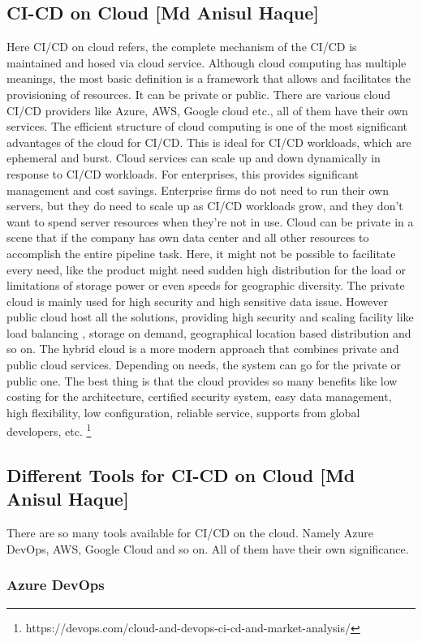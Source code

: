 %
\subsection{CI-CD on Cloud [Md Anisul Haque]}
%
Here CI/CD on cloud refers, the complete mechanism of the CI/CD is maintained and hosed via cloud service. Although cloud computing has multiple meanings, the most basic definition is a framework that allows and facilitates the provisioning of resources. It can be private or public. There are various cloud CI/CD providers like Azure, AWS, Google cloud etc., all of them have their own services\cite{inproceedings}. The efficient structure of cloud computing is one of the most significant advantages of the cloud for CI/CD. This is ideal for CI/CD workloads, which are ephemeral and burst. Cloud services can scale up and down dynamically in response to CI/CD workloads. For enterprises, this provides significant management and cost savings. Enterprise firms do not need to run their own servers, but they do need to scale up as CI/CD workloads grow, and they don't want to spend server resources when they're not in use. Cloud can be private in a scene that if the company has own data center and all other resources to accomplish the entire pipeline task. Here, it might not be possible to facilitate every need, like the product might need sudden high distribution for the load or limitations of storage power or even speeds for geographic diversity. The private cloud is mainly used for high security and high sensitive data issue. However public cloud host all the solutions, providing high security and scaling facility like load balancing , storage on demand, geographical location based distribution and so on. The hybrid cloud is a more modern approach that combines private and public cloud services. Depending on needs, the system can go for the private or public one. The best thing is that the cloud provides so many benefits like low costing for the architecture, certified security system, easy data management, high flexibility, low configuration, reliable service, supports from global developers, etc. 
\footnote{https://devops.com/cloud-and-devops-ci-cd-and-market-analysis/}
%
\subsection{Different Tools for CI-CD on Cloud [Md Anisul Haque]}
%
There are so many tools available for CI/CD on the cloud. Namely Azure DevOps, AWS, Google Cloud and so on. All of them have their own significance. 
%
\subsubsection{Azure DevOps}
%

